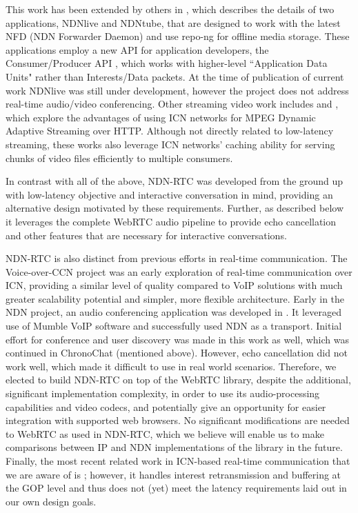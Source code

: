 \documentclass{icn/sig-alternate-2013} %
\newcommand{\ndnrtcName}{NDN-RTC} %
\begin{document}
This work has been extended by others in \cite{ndnlive-tube}, which describes the details of two applications, NDNlive and NDNtube, that are designed to work with the latest NFD (NDN Forwarder Daemon) and use repo-ng \cite{repo-ng} for offline media storage. These applications employ a new API for application developers, the Consumer/Producer API \cite{cons-prod-api}, which works with higher-level ``Application Data Units" rather than Interests/Data packets. 
At the time of publication of current work NDNlive was still under development, however the  project does not address real-time audio/video conferencing.  
Other streaming video work includes \cite{ccn-dash} and \cite{ndn-dash}, which explore the advantages of using ICN networks for MPEG Dynamic Adaptive Streaming over HTTP. Although not directly related to low-latency streaming, these works also leverage ICN networks' caching ability for serving chunks of video files efficiently to multiple consumers.  

In contrast with all of the above, \ndnrtcName{} was developed from the ground up with low-latency objective and interactive conversation in mind, providing an alternative design motivated by these requirements. Further, as described below it leverages the complete WebRTC audio pipeline to provide echo cancellation and other features that are necessary for interactive conversations. 

\ndnrtcName{} is also distinct from previous efforts in real-time communication. The Voice-over-CCN project \cite{voccn} was an early exploration of real-time communication over ICN, providing a similar level of quality compared to VoIP solutions with much greater scalability potential and simpler, more flexible architecture. 
Early in the NDN project, an audio conferencing application was developed in \cite{act-tool}. It leveraged use of Mumble VoIP software and successfully used NDN as a transport.  Initial effort for conference and user discovery was made in this work as well, which was continued in ChronoChat (mentioned above).  However, echo cancellation did not work well, which made it difficult to use in real world scenarios. Therefore, we elected to build \ndnrtcName{} on top of the WebRTC library, despite the additional, significant implementation complexity, in order to use its audio-processing capabilities and video codecs, and potentially give an opportunity for easier integration with supported web browsers.  No significant modifications are needed to WebRTC as used in \ndnrtcName{}, which we believe will enable us to make comparisons between IP and NDN implementations of the library in the future.  Finally, the most recent related work in ICN-based real-time communication that we are aware of is \cite{huawei-rtc}; however, it handles interest retransmission and buffering at the GOP level and thus does not (yet) meet the latency requirements laid out in our own design goals. 
\end{document}
